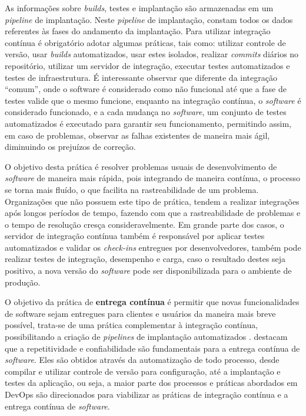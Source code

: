 \documentclass[twoside,english,brazilian]{UNISINOSartigo}
\begin{document}
As informações sobre \textit{builds}, testes e implantação são armazenadas em um \textit{pipeline} de implantação. Neste \textit{pipeline} de implantação, constam todos os dados referentes às fases do andamento da implantação. Para utilizar integração contínua é obrigatório adotar algumas práticas, tais como: utilizar controle de versão, usar \textit{builds} automatizados, usar estes isolados, realizar \textit{commits} diários no repositório, utilizar um servidor de integração, executar testes automatizados e testes de infraestrutura. É interessante observar que diferente da integração ``comum'', onde o software é considerado como não funcional até que a fase de testes valide que o mesmo funcione, enquanto na integração contínua, o \textit{software} é considerado funcionado, e a cada mudança no \textit{software}, um conjunto de testes automatizados é executado para garantir seu funcionamento, permitindo assim, em caso de problemas, observar as falhas existentes de maneira mais ágil, diminuindo os prejuízos de correção.

O objetivo desta prática é resolver problemas usuais de desenvolvimento de \textit{software} de maneira mais rápida, pois integrando de maneira contínua, o processo se torna mais fluído, o que facilita na rastreabilidade de um problema. Organizações que não possuem este tipo de prática, tendem a realizar integrações após longos períodos de tempo, fazendo com que a rastreabilidade de problemas e o tempo de resolução cresça consideravelmente. Em grande parte dos casos, o servidor de integração contínua também é responsável por aplicar testes automatizados e validar os \textit{check-ins} entregues por desenvolvedores, também pode realizar testes de integração, desempenho e carga, caso o resultado destes seja positivo, a nova versão do \textit{software} pode ser disponibilizada para o ambiente de produção.

O objetivo da prática de \textbf{entrega contínua} é permitir que novas funcionalidades de software sejam entregues para clientes e usuários da maneira mais breve possível, trata-se de uma prática complementar à integração contínua, possibilitando a criação de \textit{pipelines} de implantação automatizados \cite{Sharma2014}.
 destacam que a repetitividade e confiabilidade são fundamentais para a entrega contínua de \textit{software}. Eles são obtidos através da automatização de todo processo, desde compilar e utilizar controle de versão para configuração, até a implantação e testes da aplicação, ou seja, a maior parte dos processos e práticas abordados em DevOps são direcionados para viabilizar as práticas de integração contínua e a entrega contínua de \textit{software}.
\end{document}
